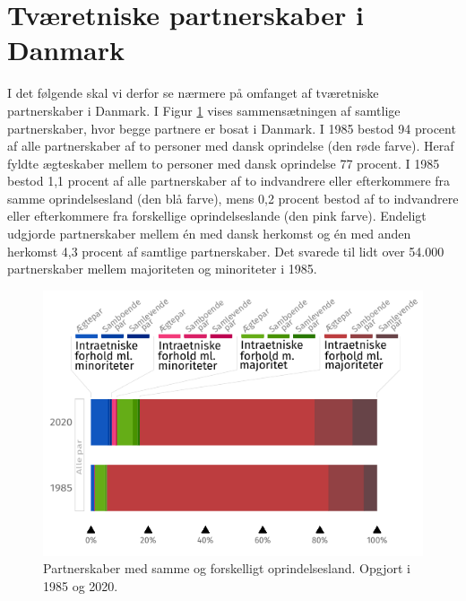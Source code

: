 \documentclass[
]{book}
\begin{document}
\section{Tværetniske partnerskaber i Danmark}\label{tvuxe6retniske-partnerskaber-i-danmark}

I det følgende skal vi derfor se nærmere på omfanget af tværetniske partnerskaber i Danmark. I Figur \ref{fig:fig-2-1} vises sammensætningen af samtlige partnerskaber, hvor begge partnere er bosat i Danmark. I 1985 bestod 94 procent af alle partnerskaber af to personer med dansk oprindelse (den røde farve). Heraf fyldte ægteskaber mellem to personer med dansk oprindelse 77 procent. I 1985 bestod 1,1 procent af alle partnerskaber af to indvandrere eller efterkommere fra samme oprindelsesland (den blå farve), mens 0,2 procent bestod af to indvandrere eller efterkommere fra forskellige oprindelseslande (den pink farve). Endeligt udgjorde partnerskaber mellem én med dansk herkomst og én med anden herkomst 4,3 procent af samtlige partnerskaber. Det svarede til lidt over 54.000 partnerskaber mellem majoriteten og minoriteter i 1985.

\begin{figure}

{\centering \includegraphics[width=0.75\linewidth]{images/figur_intergruppepartnerskaber_alle} 

}

\caption{ Partnerskaber med samme og forskelligt oprindelsesland. Opgjort i 1985 og 2020.}\label{fig:fig-2-1}
\end{figure}
\end{document}
